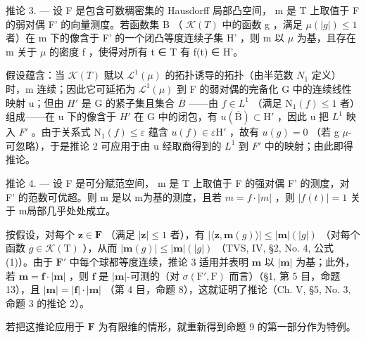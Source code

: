 推论 3. --- 设 F 是包含可数稠密集的 Hausdorff 局部凸空间， m 是 T 上取值于 F 的弱对偶 F' 的向量测度。若函数集 B （ \(\mathcal{K}(T)\) 中的函数 g ，满足 \(\mu(|g|) \leqslant 1\) 者）在 m 下的像含于 F' 的一个闭凸等度连续子集 H' ，则 m 以 \(\mu\) 为基，且存在 m 关于 \(\mu\) 的密度 f ，使得对所有 t ∈ T 有 f(t) ∈ H'。

假设蕴含：当 \(\mathcal{K}(T)\) 赋以 \(\mathcal{L}^{1}(\mu)\) 的拓扑诱导的拓扑（由半范数 \(N_{1}\) 定义）时，m 连续；因此它可延拓为 \(\mathcal{L}^{1}(\mu)\) 到 F 的弱对偶的完备化 G 中的连续线性映射 u；但由 \(H'\) 是 G 的紧子集且集合 \(\overline{B}\) ——由 \(f \in L^{1}\) （满足 \(\mathrm{N}_{1}(f) \leqslant 1\) 者）组成——在 u 下的像含于 \(H'\) 在 G 中的闭包，有 \(u(\overline{\mathrm{B}}) \subset \mathrm{H}'\) ，因此 u 把 \(L^{1}\) 映入 \(F'\) 。由于关系式 \(\mathrm{N}_{1}(f) \leqslant \varepsilon\) 蕴含 \(u(f) \in \varepsilon\mathrm{H}'\) ，故有 \(u(g) = 0\) （若 g \(\mu\)-可忽略），于是推论 2 可应用于由 u 经取商得到的 \(L^{1}\) 到 \(F'\) 中的映射；由此即得推论。

推论 4. --- 设 F 是可分赋范空间， m 是 T 上取值于 F 的强对偶 F' 的测度，对 F' 的范数可优超。则 m 是以 \textbar m\textbar 为基的测度，且若 \(m = f \cdot |m|\) ，则 \(|f(t)| = 1\) 关于 \textbar m\textbar 局部几乎处处成立。

按假设，对每个 \(\mathbf{z} \in \mathbf{F}\) （满足 \(|\mathbf{z}| \leqslant 1\) 者），有 \(|\langle \mathbf{z}, \mathbf{m}(g) \rangle| \leqslant |\mathbf{m}|(|g|)\) （对每个函数 \(g \in \mathcal{K}(\mathrm{T})\) ），从而 \(|\mathbf{m}(g)| \leqslant |\mathbf{m}|(|g|)\) （TVS, IV, §2, No. 4, 公式 (1)）。由于 \(\mathbf{F}'\) 中每个球都等度连续，推论 3 适用并表明 \(\mathbf{m}\) 以 \(|\mathbf{m}|\) 为基；此外，若 \(\mathbf{m} = \mathbf{f} \cdot |\mathbf{m}|\) ，则 \(\mathbf{f}\) 是 \(|\mathbf{m}|\)-可测的（对 \(\sigma(\mathrm{F}', \mathrm{F})\) 而言）（§1, 第 5 目，命题 13），且 \(|\mathbf{m}| = |\mathbf{f}| \cdot |\mathbf{m}|\) （第 4 目，命题 8），这就证明了推论（Ch. V, §5, No. 3, 命题 3 的推论 2）。

若把这推论应用于 \(\mathbf{F}\) 为有限维的情形，就重新得到命题 9 的第一部分作为特例。

